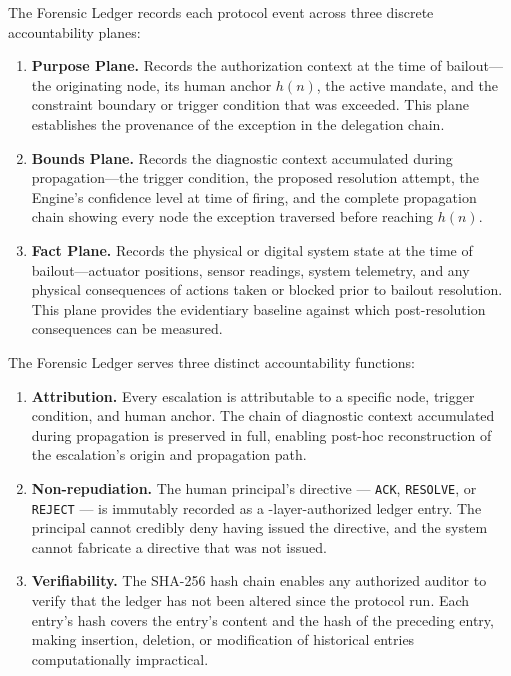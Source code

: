 The Forensic Ledger records each protocol event across three discrete
accountability planes:

\begin{enumerate}\itemsep=0pt
\item \textbf{Purpose Plane.}  Records the authorization context at the time
of bailout---the originating node, its human anchor $h(n)$, the active mandate,
and the constraint boundary or trigger condition that was exceeded.  This plane
establishes the provenance of the exception in the delegation chain.

\item \textbf{Bounds Plane.}  Records the diagnostic context accumulated
during propagation---the trigger condition, the proposed resolution attempt, the
\bounds{} Engine's confidence level at time of firing, and the complete
propagation chain showing every node the exception traversed before reaching
$h(n)$.

\item \textbf{Fact Plane.}  Records the physical or digital system state at the
time of bailout---actuator positions, sensor readings, system telemetry, and any
physical consequences of actions taken or blocked prior to bailout resolution.
This plane provides the evidentiary baseline against which post-resolution
consequences can be measured.
\end{enumerate}

The Forensic Ledger serves three distinct accountability functions:

\begin{enumerate}\itemsep=0pt
\item \textbf{Attribution.}  Every escalation is attributable to a specific
node, trigger condition, and human anchor.  The chain of diagnostic context
accumulated during propagation is preserved in full, enabling post-hoc
reconstruction of the escalation's origin and propagation path.

\item \textbf{Non-repudiation.}  The human principal's directive ---
\texttt{ACK}, \texttt{RESOLVE}, or \texttt{REJECT} --- is immutably recorded as a
\purpose-layer-authorized ledger entry.  The principal cannot credibly deny
having issued the directive, and the system cannot fabricate a directive that
was not issued.

\item \textbf{Verifiability.}  The SHA-256 hash chain enables any authorized
auditor to verify that the ledger has not been altered since the protocol run.
Each entry's hash covers the entry's content and the hash of the preceding
entry, making insertion, deletion, or modification of historical entries
computationally impractical.
\end{enumerate}

